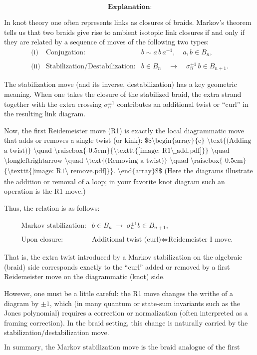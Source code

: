 \documentclass[12p]{article}
\newcounter{answercounter}
\newenvironment{answer}[1][]
{\refstepcounter{answercounter}%
\begin{tcolorbox}[
    title=Answer \theanswercounter: #1,
    colback=white, %
    colframe=gray,
    coltext=black, %
    fonttitle=\bfseries\normalsize,
    top=2mm,
    bottom=2mm,
    enlarge top initially by=5mm
]
\small
}
{\end{tcolorbox}}
\begin{document}
\begin{answer}[by openai/o3-mini-high (generated in 1 minutes and 14 seconds.)]
\[
\textbf{Explanation:}
\]

In knot theory one often represents links as closures of braids. Markov’s theorem tells us that two braids give rise to ambient isotopic link closures if and only if they are related by a sequence of moves of the following two types:
\[
\begin{array}{rcl}
\text{(i)} & \text{Conjugation:} & b \sim a\, b\, a^{-1}, \quad a,b \in B_n, \\
\\
\text{(ii)} & \text{Stabilization/Destabilization:} & b \in B_n \quad \longrightarrow \quad \sigma_n^{\pm1}\, b \in B_{n+1}.
\end{array}
\]

The stabilization move (and its inverse, destabilization) has a key geometric meaning. When one takes the closure of the stabilized braid, the extra strand together with the extra crossing \(\sigma_n^{\pm1}\) contributes an additional twist or “curl” in the resulting link diagram. 

Now, the first Reidemeister move (R1) is exactly the local diagrammatic move that adds or removes a single twist (or kink):
\[
\begin{array}{c}
\text{(Adding a twist)} \quad \raisebox{-0.5cm}{\texttt{[image: R1\_add.pdf]}} \quad \longleftrightarrow \quad \text{(Removing a twist)} \quad \raisebox{-0.5cm}{\texttt{[image: R1\_remove.pdf]}}.
\end{array}
\]
(Here the diagrams illustrate the addition or removal of a loop; in your favorite knot diagram such an operation is the R1 move.)

Thus, the relation is as follows: 

\[
\begin{array}{rcl}
\text{Markov stabilization:} & b\in B_n \; \longrightarrow \; \sigma_n^{\pm 1} b\in B_{n+1}, & \\
\\
\text{Upon closure:} & \text{Additional twist (curl)} \Longleftrightarrow \text{Reidemeister I move.} &
\end{array}
\]

That is, the extra twist introduced by a Markov stabilization on the algebraic (braid) side corresponds exactly to the “curl” added or removed by a first Reidemeister move on the diagrammatic (knot) side.

However, one must be a little careful: the R1 move changes the writhe of a diagram by \(\pm1\), which (in many quantum or state-sum invariants such as the Jones polynomial) requires a correction or normalization (often interpreted as a framing correction). In the braid setting, this change is naturally carried by the stabilization/destabilization move. 

\[
\boxed{\text{In summary, the Markov stabilization move is the braid analogue of the first Reidemeister move.}}
\]
\end{answer}
\end{document}
